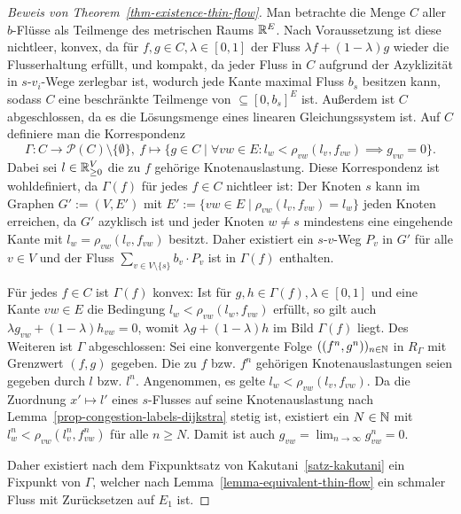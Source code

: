 \begin{proof}[Beweis von Theorem~\ref{thm-existence-thin-flow}]
	Man betrachte die Menge $C$ aller $b$-Flüsse als Teilmenge des metrischen Raums $\mathbb{R}^E$.
	Nach Voraussetzung ist diese nichtleer, konvex, da für $f, g\in C, \lambda \in [0,1]$ der Fluss $\lambda f + (1-\lambda)g$ wieder die Flusserhaltung erfüllt, und kompakt, da jeder Fluss in $C$ aufgrund der Azyklizität in $s$-$v_i$-Wege zerlegbar ist, wodurch jede Kante maximal Fluss $b_s$ besitzen kann, sodass $C$ eine beschränkte Teilmenge von $\subseteq [0, b_s]^E$ ist.
	Außerdem ist $C$ abgeschlossen, da es die Lösungsmenge eines linearen Gleichungssystem ist.
	Auf $C$ definiere man die Korrespondenz
	\[
	\Gamma: C\to \mathcal{P}(C)\setminus\{ \emptyset \}, ~ f\mapsto \{ g\in C \mid \forall vw\in E: l_w < \rho_{vw}(l_v, f_{vw}) \implies g_{vw} = 0 \}.
	\]
	Dabei sei $l\in\mathbb{R}_{\geq 0}^V$ die zu $f$ gehörige Knotenauslastung.
	Diese Korrespondenz ist wohldefiniert, da $\Gamma(f)$ für jedes $f\in C$ nichtleer ist:
	Der Knoten $s$ kann im Graphen $G':= (V, E')$ mit $E':= \{ vw\in E \mid \rho_{vw}(l_v, f_{vw})=l_w \}$ jeden Knoten erreichen, da $G'$ azyklisch ist und jeder Knoten $w\neq s$ mindestens eine eingehende Kante mit $l_w = \rho_{vw}(l_v, f_{vw})$ besitzt. 
	Daher existiert ein $s$-$v$-Weg $P_v$ in $G'$ für alle $v\in V$ und der Fluss $\sum_{v\in V\setminus\{ s\}} b_v \cdot P_v$ ist in $\Gamma(f)$ enthalten.
	
	Für jedes $f\in C$ ist $\Gamma(f)$ konvex: Ist für $g, h\in \Gamma(f), \lambda\in [0,1]$ und eine Kante $vw\in E$ die Bedingung $l_w < \rho_{vw}(l_w, f_{vw})$ erfüllt, so gilt auch $\lambda g_{vw} + (1-\lambda) h_{vw} = 0$, womit $\lambda g + (1-\lambda)h$ im Bild $\Gamma(f)$ liegt.
	Des Weiteren ist $\Gamma$ abgeschlossen: 
	Sei eine konvergente Folge $((f^{n}, g^{n}))_{n\in\mathbb{N}}$ in $R_\Gamma$ mit Grenzwert $(f, g)$ gegeben.
	Die zu $f$ bzw. $f^n$ gehörigen Knotenauslastungen seien gegeben durch $l$ bzw. $l^n$.
	Angenommen, es gelte $l_w < \rho_{vw}(l_v, f_{vw})$.
	Da die Zuordnung $x'\mapsto l'$ eines $s$-Flusses auf seine Knotenauslastung nach Lemma~\ref{prop-congestion-labels-dijkstra} stetig ist, existiert ein $N\in\mathbb{N}$ mit $l_w^n<\rho_{vw}(l_v^n, f_{vw}^n)$ für alle $n\geq N$.
	Damit ist auch $g_{vw} = \lim_{n\to\infty} g_{vw}^n = 0$.
	
	Daher existiert nach dem Fixpunktsatz von Kakutani~\ref{satz-kakutani} ein Fixpunkt von $\Gamma$, welcher nach Lemma~\ref{lemma-equivalent-thin-flow} ein schmaler Fluss mit Zurücksetzen auf $E_1$ ist.
\end{proof}

